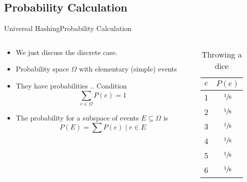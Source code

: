 \subsection{Probability Calculation}

\begin{frame}{Universal Hashing}{Probability Calculation}
  \begin{columns}
    \begin{column}{0.65\textwidth}
      \begin{itemize}
        \item<2->
          We just discuss the discrete case.
        \item<3->
          Probability space {\color{Mittel-Blau}$\Omega$} with {\color{Mittel-Blau}elementary (simple) events}
        \item
          They have probabilities .. Condition  {\color{Mittel-Blau}\[\sum_{e \in \Omega} P(e) = 1\]}
        \item
          The probability for a subspace of events $E \subseteq \Omega$ is
          \[P(E) = \sum P(e) \mid e \in E\]
      \end{itemize}
    \end{column}
    \begin{column}{0.35\textwidth}
      \begin{table}[!h]
        \caption{Throwing a dice}
        \label{tab:probabilities:rolling_dice}
        \begin{tabularx}{0.5\linewidth}{c|c}
          $e$ & $P(e)$\\
          \midrule
          1 & $\sfrac{1}{6}$\\
          2 & $\sfrac{1}{6}$\\
          3 & $\sfrac{1}{6}$\\
          4 & $\sfrac{1}{6}$\\
          5 & $\sfrac{1}{6}$\\
          6 & $\sfrac{1}{6}$\\
        \end{tabularx}
      \end{table}
    \end{column}
  \end{columns}
\end{frame}


